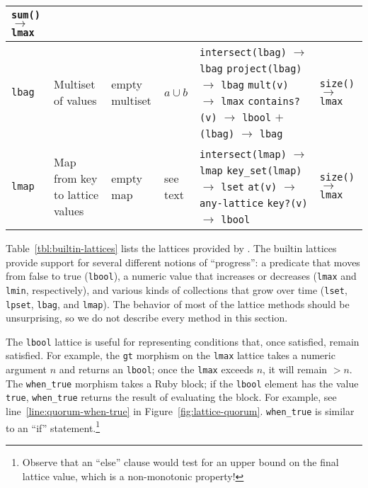 \begin{table*}[t]
\begin{center}
\begin{tabular}{|l|l|l|l|p{1.57in}|p{1.09in}|}
\texttt{sum()} $\to$ \texttt{lmax} \\
\hline
\texttt{lbag} & Multiset of values & empty multiset & $a \cup b$ &
\texttt{intersect(lbag)} $\to$ \texttt{lbag}\newline
\texttt{project(lbag)} $\to$ \texttt{lbag}\newline
\texttt{mult(v)} $\to$ \texttt{lmax}\newline
\texttt{contains?(v)} $\to$ \texttt{lbool}\newline
\texttt{$\mathtt{+}$(lbag)} $\to$ \texttt{lbag}
& \texttt{size()} $\to$ \texttt{lmax}\\
\hline
\texttt{lmap} & Map from key to lattice values & empty map & see text&
\texttt{intersect(lmap)} $\to$ \texttt{lmap}\newline
\texttt{key\_set(lmap)} $\to$ \texttt{lset}\newline
\texttt{at(v)} $\to$ \texttt{any-lattice}\newline
\texttt{key?(v)} $\to$ \texttt{lbool}
& \texttt{size()} $\to$ \texttt{lmax}\\
\hline
\end{tabular}
\caption{Builtin lattices in \lang. \texttt{v} denotes a Ruby value and
  \texttt{n} denotes a number.}
\label{tbl:builtin-lattices}
\end{center}
\end{table*}


Table~\ref{tbl:builtin-lattices} lists the lattices provided by \lang. The
builtin lattices provide support for several different notions of ``progress'':
a predicate that moves from false to true (\texttt{lbool}), a numeric value that
increases or decreases (\texttt{lmax} and \texttt{lmin}, respectively), and
various kinds of collections that grow over time (\texttt{lset}, \texttt{lpset},
\texttt{lbag}, and \texttt{lmap}). The behavior of most of the lattice methods
should be unsurprising, so we do not describe every method in this section.

The \texttt{lbool} lattice is useful for representing conditions that, once
satisfied, remain satisfied. For example, the \texttt{gt} morphism on the
\texttt{lmax} lattice takes a numeric argument $n$ and returns an
\texttt{lbool}; once the \texttt{lmax} exceeds $n$, it will remain $>n$. The
\texttt{when\_true} morphism takes a Ruby block; if the \texttt{lbool} element
has the value \texttt{true}, \texttt{when\_true} returns the result of
evaluating the block. For example, see line~\ref{line:quorum-when-true} in
Figure~\ref{fig:lattice-quorum}. \texttt{when\_true} is similar to an ``if''
statement.\footnote{Observe that an ``else'' clause would test for an upper bound on the final lattice value, which is a non-monotonic property!}

